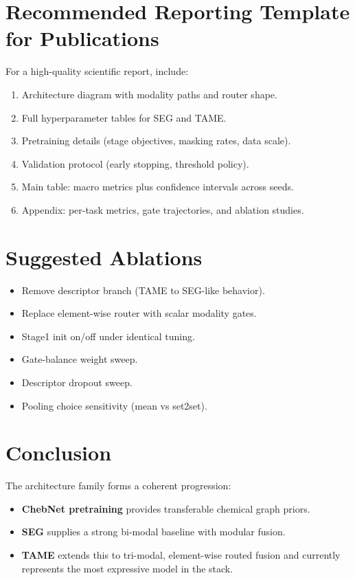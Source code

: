 \documentclass[11pt,a4paper]{article}
\begin{document}
\section{Recommended Reporting Template for Publications}
For a high-quality scientific report, include:
\begin{enumerate}[label=\arabic*.]
    \item Architecture diagram with modality paths and router shape.
    \item Full hyperparameter tables for SEG and TAME.
    \item Pretraining details (stage objectives, masking rates, data scale).
    \item Validation protocol (early stopping, threshold policy).
    \item Main table: macro metrics plus confidence intervals across seeds.
    \item Appendix: per-task metrics, gate trajectories, and ablation studies.
\end{enumerate}

\section{Suggested Ablations}
\begin{itemize}
    \item Remove descriptor branch (TAME to SEG-like behavior).
    \item Replace element-wise router with scalar modality gates.
    \item Stage1 init on/off under identical tuning.
    \item Gate-balance weight sweep.
    \item Descriptor dropout sweep.
    \item Pooling choice sensitivity (mean vs set2set).
\end{itemize}

\section{Conclusion}
The architecture family forms a coherent progression:
\begin{itemize}
    \item \textbf{ChebNet pretraining} provides transferable chemical graph priors.
    \item \textbf{SEG} supplies a strong bi-modal baseline with modular fusion.
    \item \textbf{TAME} extends this to tri-modal, element-wise routed fusion and currently represents the most expressive model in the stack.
\end{itemize}
\end{document}
